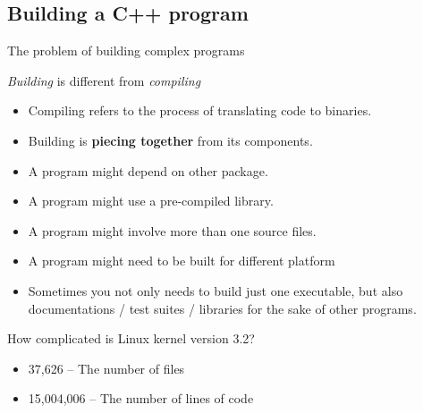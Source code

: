 \subsection{Building a C++ program}
\begin{frame}{The problem of building complex programs}
\vspace{-0.10in}
\begin{block}{\textit{Building} is different from \textit{compiling}}
	\vspace{-0.07in}
	\begin{itemize}
		\item Compiling refers to the process of translating code to binaries.
		\item Building is \textbf{piecing together} from its components.
		\item A program might depend on other package.
		\item A program might use a pre-compiled library.
		\item A program might involve more than one source files.
		\item A program might need to be built for different platform
		\item Sometimes you not only needs to build just one executable, but also documentations / test suites / libraries for the sake of other programs.
	\end{itemize}
\end{block}
\vspace{-0.15in}
\begin{block}{How complicated is Linux kernel version 3.2?}
	\vspace{-0.07in}
	\begin{itemize}
		\item 37,626 – The number of files 
		\item 15,004,006 – The number of lines of code 
	\end{itemize}
\end{block}
\end{frame}

